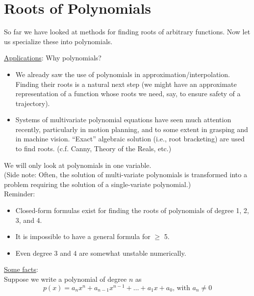 \chapter{Roots of Polynomials}

So far we have looked at methods for finding roots of arbitrary functions. Now let us specialize these into polynomials. \newline

\noindent \underline{Applications}: Why polynomials?
\begin{itemize}
    \item We already saw the use of polynomials in approximation/interpolation. Finding their roots is a natural next step (we might have an approximate representation of a function whose roots we need, say, to ensure safety of a trajectory).
    \item Systems of multivariate polynomial equations have seen much attention recently, particularly in motion planning, and to some extent in grasping and in machine vision. ``Exact'' algebraic solution (i.e., root bracketing) are used to find roots. (c.f. Canny, Theory of the Reals, etc.)
\end{itemize}


\vspace{1em}

\noindent We will only look at polynomials in one variable. \\
(Side note: Often, the solution of multi-variate polynomials is transformed into a problem requiring the solution of a single-variate polynomial.) \\

\noindent Reminder: 
\begin{itemize}
    \item Closed-form formulas exist for finding the roots of polynomials of degree 1, 2, 3, and 4.
    \item It is impossible to have a general formula for $\geq$ 5.
    \item Even degree 3 and 4 are somewhat unstable numerically.
\end{itemize}

\noindent \underline{Some facts}: \\

Suppose  we write a polynomial of degree $n$ as
$$p(x) = a_n x^n + a_{n-1} x^{n-1} + \dots + a_1 x + a_0\text{, with }a_n \neq 0$$

